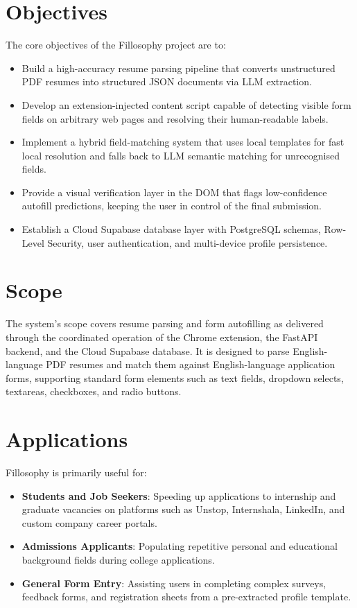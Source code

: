 \documentclass[12pt,a4paper]{report}
\begin{document}
\section{Objectives}
The core objectives of the Fillosophy project are to:
\begin{itemize}
    \item Build a high-accuracy resume parsing pipeline that converts unstructured PDF resumes into structured JSON documents via LLM extraction.
    \item Develop an extension-injected content script capable of detecting visible form fields on arbitrary web pages and resolving their human-readable labels.
    \item Implement a hybrid field-matching system that uses local templates for fast local resolution and falls back to LLM semantic matching for unrecognised fields.
    \item Provide a visual verification layer in the DOM that flags low-confidence autofill predictions, keeping the user in control of the final submission.
    \item Establish a Cloud Supabase database layer with PostgreSQL schemas, Row-Level Security, user authentication, and multi-device profile persistence.
\end{itemize}

\section{Scope}
The system's scope covers resume parsing and form autofilling as delivered through the coordinated operation of the Chrome extension, the FastAPI backend, and the Cloud Supabase database. It is designed to parse English-language PDF resumes and match them against English-language application forms, supporting standard form elements such as text fields, dropdown selects, textareas, checkboxes, and radio buttons.

\section{Applications}
Fillosophy is primarily useful for:
\begin{itemize}
    \item \textbf{Students and Job Seekers}: Speeding up applications to internship and graduate vacancies on platforms such as Unstop, Internshala, LinkedIn, and custom company career portals.
    \item \textbf{Admissions Applicants}: Populating repetitive personal and educational background fields during college applications.
    \item \textbf{General Form Entry}: Assisting users in completing complex surveys, feedback forms, and registration sheets from a pre-extracted profile template.
\end{itemize}
\end{document}
